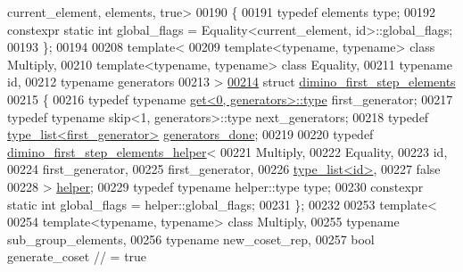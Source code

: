 \begin{DoxyCode}
      current\_element, elements, true>
00190 \{
00191   \textcolor{keyword}{typedef} elements type;
00192   constexpr \textcolor{keyword}{static} \textcolor{keywordtype}{int} global\_flags = Equality<current\_element, id>::global\_flags;
00193 \};
00194 
00208 \textcolor{keyword}{template}<
00209   \textcolor{keyword}{template}<\textcolor{keyword}{typename}, \textcolor{keyword}{typename}> \textcolor{keyword}{class }Multiply,
00210   \textcolor{keyword}{template}<\textcolor{keyword}{typename}, \textcolor{keyword}{typename}> \textcolor{keyword}{class }Equality,
00211   \textcolor{keyword}{typename} id,
00212   \textcolor{keyword}{typename} generators
00213 >
\hyperlink{struct_eigen_1_1internal_1_1group__theory_1_1dimino__first__step__elements}{00214} \textcolor{keyword}{struct }\hyperlink{struct_eigen_1_1internal_1_1group__theory_1_1dimino__first__step__elements}{dimino\_first\_step\_elements}
00215 \{
00216   \textcolor{keyword}{typedef} \textcolor{keyword}{typename} \hyperlink{struct_eigen_1_1internal_1_1get}{get<0, generators>::type} first\_generator;
00217   \textcolor{keyword}{typedef} \textcolor{keyword}{typename} skip<1, generators>::type next\_generators;
00218   \textcolor{keyword}{typedef} \hyperlink{struct_eigen_1_1internal_1_1type__list}{type\_list<first\_generator>} \hyperlink{struct_eigen_1_1internal_1_1type__list}{generators\_done};
00219 
00220   \textcolor{keyword}{typedef} \hyperlink{struct_eigen_1_1internal_1_1group__theory_1_1dimino__first__step__elements__helper}{dimino\_first\_step\_elements\_helper}<
00221     Multiply,
00222     Equality,
00223     id,
00224     first\_generator,
00225     first\_generator,
00226     \hyperlink{struct_eigen_1_1internal_1_1type__list}{type\_list<id>},
00227     \textcolor{keyword}{false}
00228   > \hyperlink{struct_eigen_1_1internal_1_1group__theory_1_1dimino__first__step__elements__helper}{helper};
00229   \textcolor{keyword}{typedef} \textcolor{keyword}{typename} helper::type type;
00230   constexpr \textcolor{keyword}{static} \textcolor{keywordtype}{int} global\_flags = helper::global\_flags;
00231 \};
00232 
00253 \textcolor{keyword}{template}<
00254   \textcolor{keyword}{template}<\textcolor{keyword}{typename}, \textcolor{keyword}{typename}> \textcolor{keyword}{class }Multiply,
00255   \textcolor{keyword}{typename} sub\_group\_elements,
00256   \textcolor{keyword}{typename} new\_coset\_rep,
00257   \textcolor{keywordtype}{bool} generate\_coset      \textcolor{comment}{// = true}

\end{DoxyCode}
